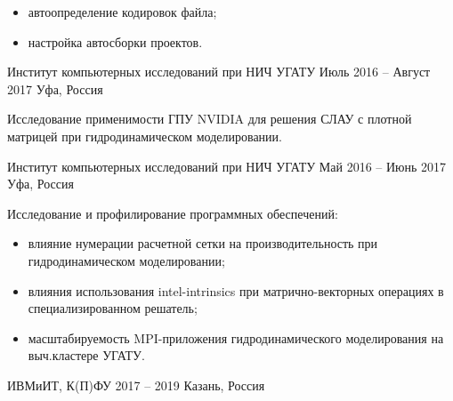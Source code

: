 \documentclass[10pt,a4paper,ragged2e,withhyper]{altacv}
\begin{document}
\begin{paracol}{2}
\begin{itemize}
  \item автоопределение кодировок файла;
  \smallskip

  \item настройка автосборки проектов.

\end{itemize}

\divider

{Институт компьютерных исследований при НИЧ УГАТУ}
{Июль 2016 -- Август 2017}
{Уфа, Россия}

Исследование применимости ГПУ NVIDIA для решения СЛАУ с плотной матрицей при гидродинамическом моделировании.

\divider

{Институт компьютерных исследований при НИЧ УГАТУ}
{Май 2016 -- Июнь 2017}
{Уфа, Россия}

Исследование и профилирование программных обеспечений:

\begin{itemize}

  \item влияние нумерации расчетной сетки на производительность при гидродинамическом моделировании;
  \smallskip

  \item влияния использования intel-intrinsics при матрично-векторных операциях в специализированном решатель;
  \smallskip

  \item масштабируемость MPI-приложения гидродинамического моделирования на выч.кластере УГАТУ.

\end{itemize}

\switchcolumn




\smallskip
{}


{ИВМиИТ, К(П)ФУ}
{2017 -- 2019}
{Казань, Россия}


\end{paracol}
\end{document}
